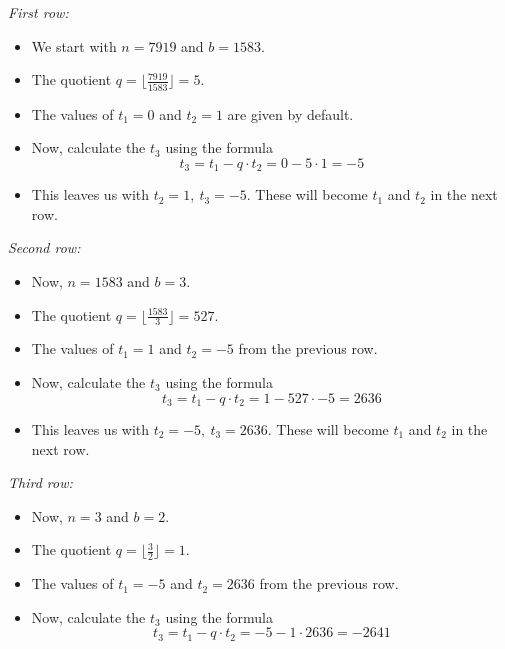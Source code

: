 {\begin{enumerate}[label=\arabic*.]
              \textit{First row:}
              \begin{itemize}
                  \item We start with \(n = 7919\) and \(b = 1583\).
                  \item The quotient \(q = \lfloor \frac{7919}{1583} \rfloor = 5\).
                  \item The values of \(t_1 = 0\) and \(t_2 = 1\) are given by default.
                  \item Now, calculate the \(t_3\) using the formula
                        \[
                            t_3 = t_1 - q \cdot t_2 = 0 - 5 \cdot 1 = -5
                        \]
                  \item This leaves us with \(t_2 = 1, \ t_3 = -5\). These will become \(t_1\) and \(t_2\) in the next row.
              \end{itemize}
              \textit{Second row:}
              \begin{itemize}
                  \item Now, \(n = 1583\) and \(b = 3\).
                  \item The quotient \(q = \lfloor \frac{1583}{3} \rfloor = 527\).
                  \item The values of \(t_1 = 1\) and \(t_2 = -5\) from the previous row.
                  \item Now, calculate the \(t_3\) using the formula
                        \[
                            t_3 = t_1 - q \cdot t_2 = 1 - 527 \cdot -5 = 2636
                        \]
                  \item This leaves us with \(t_2 = -5, \ t_3 = 2636\). These will become \(t_1\) and \(t_2\) in the next row.
              \end{itemize}
              \textit{Third row:}
              \begin{itemize}
                  \item Now, \(n = 3\) and \(b = 2\).
                  \item The quotient \(q = \lfloor \frac{3}{2} \rfloor = 1\).
                  \item The values of \(t_1 = -5\) and \(t_2 = 2636\) from the previous row.
                  \item Now, calculate the \(t_3\) using the formula
                        \[
                            t_3 = t_1 - q \cdot t_2 = -5 - 1 \cdot 2636 = -2641
                        \]
              \end{itemize}

\end{enumerate}}
